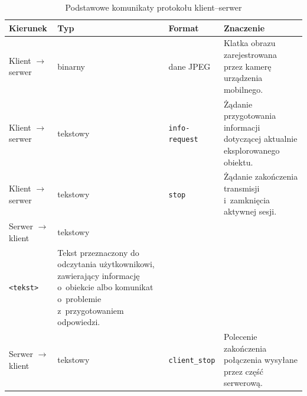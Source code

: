 \begin{table}[htbp]
    \centering
    \caption{Podstawowe komunikaty protokołu klient--serwer}
    \label{tab:komunikaty_protokolu}
    \begin{tabularx}{\textwidth}{lllX}

        \toprule

        \textbf{Kierunek}           &
        \textbf{Typ}                &
        \textbf{Format}             &
        \textbf{Znaczenie}                                                                                                                        \\

        \midrule

        Klient $\rightarrow$ serwer &
        binarny                     &
        dane JPEG                   &
        Klatka obrazu zarejestrowana przez kamerę urządzenia mobilnego.                                                                           \\

        \addlinespace

        Klient $\rightarrow$ serwer &
        tekstowy                    &
        \texttt{info-request}       &
        Żądanie przygotowania informacji dotyczącej aktualnie eksplorowanego obiektu.                                                             \\

        \addlinespace

        Klient $\rightarrow$ serwer &
        tekstowy                    &
        \texttt{stop}               &
        Żądanie zakończenia transmisji i~zamknięcia aktywnej sesji.                                                                               \\

        \addlinespace

        Serwer $\rightarrow$ klient &
        tekstowy                    &
        \makecell[tl]{\texttt{info-response:}                                                                                                     \\\texttt{<tekst>}} &
        Tekst przeznaczony do odczytania użytkownikowi, zawierający informację o~obiekcie albo komunikat o~problemie z~przygotowaniem odpowiedzi. \\

        \addlinespace


        Serwer $\rightarrow$ klient &
        tekstowy                    &
        \texttt{client\_stop}       &
        Polecenie zakończenia połączenia wysyłane przez część serwerową.                                                                          \\

        \bottomrule
    \end{tabularx}
\end{table}

